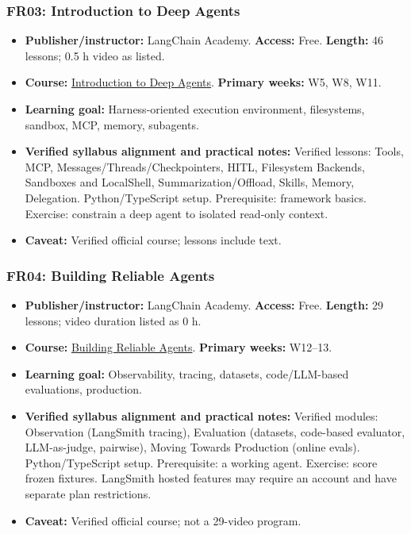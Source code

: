 \documentclass[
  10pt,
]{article}
\providecommand{\tightlist}{%
  \setlength{\itemsep}{0pt}\setlength{\parskip}{0pt}}
\begin{document}
\subsubsection{FR03: Introduction to Deep
Agents}\label{fr03-introduction-to-deep-agents}

\begin{itemize}
\tightlist
\item
  \textbf{Publisher/instructor:} LangChain Academy. \textbf{Access:}
  Free. \textbf{Length:} 46 lessons; 0.5 h video as listed.
\item
  \textbf{Course:}
  \href{https://academy.langchain.com/courses/foundation-introduction-to-deepagents}{Introduction
  to Deep Agents}. \textbf{Primary weeks:} W5, W8, W11.
\item
  \textbf{Learning goal:} Harness-oriented execution environment,
  filesystems, sandbox, MCP, memory, subagents.
\item
  {\raggedright \textbf{Verified syllabus alignment and practical notes:} Verified
  lessons: Tools, MCP, Messages/\allowbreak Threads/\allowbreak Checkpointers, HITL, Filesystem
  Backends, Sandboxes and LocalShell, Summarization/\allowbreak Offload, Skills,
  Memory, Delegation. Python/\allowbreak TypeScript setup. Prerequisite: framework
  basics. Exercise: constrain a deep agent to isolated read-only
  context.\par}
\item
  \textbf{Caveat:} Verified official course; lessons include text.
\end{itemize}

\subsubsection{FR04: Building Reliable
Agents}\label{fr04-building-reliable-agents}

\begin{itemize}
\tightlist
\item
  \textbf{Publisher/instructor:} LangChain Academy. \textbf{Access:}
  Free. \textbf{Length:} 29 lessons; video duration listed as 0 h.
\item
  \textbf{Course:}
  \href{https://academy.langchain.com/courses/building-reliable-agents}{Building
  Reliable Agents}. \textbf{Primary weeks:} W12--13.
\item
  \textbf{Learning goal:} Observability, tracing, datasets,
  code/LLM-based evaluations, production.
\item
  {\raggedright \textbf{Verified syllabus alignment and practical notes:} Verified
  modules: Observation (LangSmith tracing), Evaluation (datasets,
  code-based evaluator, LLM-as-judge, pairwise), Moving Towards
  Production (online evals). Python/\allowbreak TypeScript setup. Prerequisite: a
  working agent. Exercise: score frozen fixtures. LangSmith hosted
  features may require an account and have separate plan restrictions.\par}
\item
  \textbf{Caveat:} Verified official course; not a 29-video program.
\end{itemize}
\end{document}
